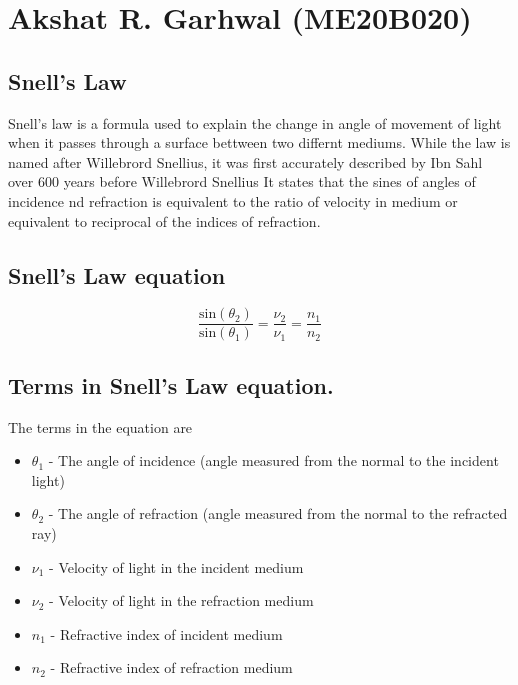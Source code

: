 \section{Akshat R. Garhwal (ME20B020)}
\subsection{Snell's Law}
Snell's law is a formula used to explain the change in angle of movement of light when it passes through a surface bettween two differnt mediums.
While the law is named after Willebrord Snellius, it was first accurately described by Ibn Sahl over 600 years before Willebrord Snellius
It states that the sines of angles of incidence nd refraction is equivalent to the ratio of velocity in medium or equivalent to reciprocal of the indices of refraction.
\subsection{Snell's Law equation}
\begin{equation}
	\frac {\text{sin}(\theta_{2})}{\text{sin}(\theta_{1})}  = \frac {\nu_{2}}{\nu_{1}} = {\frac  {n_{1}}{n_{2}}}
\end{equation}
\subsection{Terms in Snell's Law equation.}
The terms in the equation are 
\begin{itemize}
\item $\theta_{1}$ - The angle of incidence (angle measured from the normal to the incident light) 
\item $\theta_{2}$ - The angle of refraction (angle measured from the normal to the refracted ray)
\item $\nu_{1}$ - Velocity of light in the incident medium
\item $\nu_{2}$ - Velocity of light in the refraction medium
\item $n_{1}$ - Refractive index of incident medium
\item $n_{2}$ - Refractive index of refraction medium
\end{itemize}
